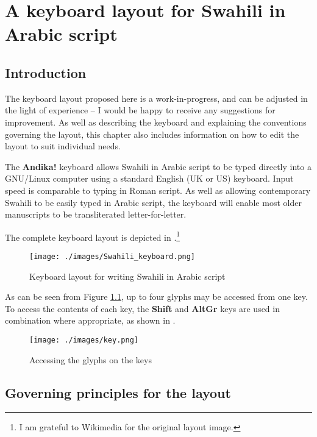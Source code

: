 \chapter{A keyboard layout for Swahili in Arabic script}
\label{ch:keyboard}

\section{Introduction}

The keyboard layout proposed here is a work-in-progress, and can be adjusted in the light of experience -- I would be happy to receive any suggestions for improvement.  As well as describing the keyboard and explaining the conventions governing the layout, this chapter also includes information on how to edit the layout to suit individual needs.

The \textbf{Andika!} keyboard allows Swahili in Arabic script to be typed directly into a GNU/Linux computer using a standard English (UK or US) keyboard. Input speed is comparable to typing in Roman script.  As well as allowing contemporary Swahili to be easily typed in Arabic script, the keyboard will enable most older manuscripts to be transliterated letter-for-letter.

The complete keyboard layout is depicted in .\footnote{I am grateful to Wikimedia for the original layout image.} 

\begin{figure}[!ht]
 \centering
 \texttt{[image: ./images/Swahili\_keyboard.png]}
 \caption{Keyboard layout for writing Swahili in Arabic script}
 \label{fig:kblayout}
\end{figure}

As can be seen from Figure \ref{fig:kblayout}, up to four glyphs may be accessed from one key.  To access the contents of each key, the \textbf{Shift} and \textbf{AltGr} keys are used in combination where appropriate, as shown in .

\begin{figure}[!ht]
 \centering
 \texttt{[image: ./images/key.png]}
 \caption{Accessing the glyphs on the keys}
 \label{fig:key}
\end{figure}

\section{Governing principles for the layout}


